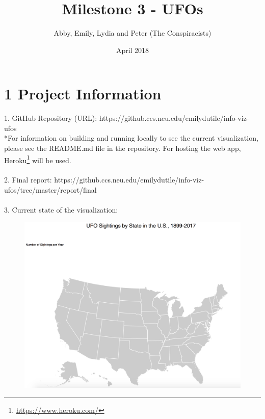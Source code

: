 \documentclass{neu_handout}
\title{Milestone 3 - UFOs}
\author{Abby, Emily, Lydia and Peter (The Conspiracists)}
\date{April 2018}
\begin{document}
\section*{1 Project Information}
1. GitHub Repository (URL): https://github.ccs.neu.edu/emilydutile/info-viz-ufos \\

*For information on building and running locally to see the current visualization, please see the README.md file in the repository. For hosting the web app, Heroku\footnote{\url{https://www.heroku.com/}} will be used.\\\\


2. Final report: https://github.ccs.neu.edu/emilydutile/info-viz-ufos/tree/master/report/final\\\\


3. Current state of the visualization:\\
\begin{figure}[h]
\centering
{
\includegraphics[width=0.6\linewidth]{site}
}
\end{figure}
\end{document}
